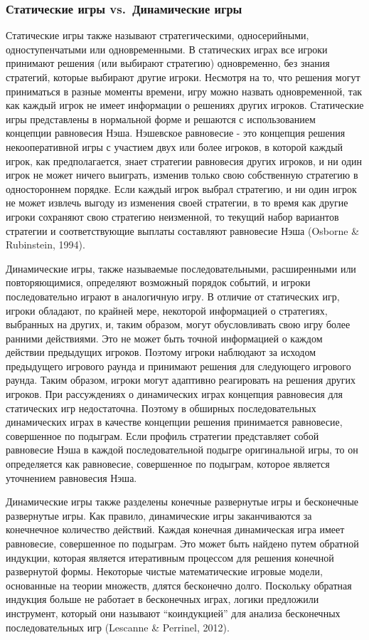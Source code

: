 \subsubsection{Статические игры vs.~Динамические игры}

Статические игры также называют стратегическими, односерийными,
одноступенчатыми или одновременными. В статических играх все игроки
принимают решения (или выбирают стратегию) одновременно, без знания
стратегий, которые выбирают другие игроки. Несмотря на то, что решения
могут приниматься в разные моменты времени, игру можно назвать
одновременной, так как каждый игрок не имеет информации о решениях
других игроков. Статические игры представлены в нормальной форме и
решаются с использованием концепции равновесия Нэша. Нэшевское
равновесие - это концепция решения некооперативной игры с участием двух
или более игроков, в которой каждый игрок, как предполагается, знает
стратегии равновесия других игроков, и ни один игрок не может ничего
выиграть, изменив только свою собственную стратегию в одностороннем
порядке. Если каждый игрок выбрал стратегию, и ни один игрок не может
извлечь выгоду из изменения своей стратегии, в то время как другие
игроки сохраняют свою стратегию неизменной, то текущий набор вариантов
стратегии и соответствующие выплаты составляют равновесие Нэша (Osborne
\& Rubinstein, 1994).

Динамические игры, также называемые последовательными, расширенными или
повторяющимися, определяют возможный порядок событий, и игроки
последовательно играют в аналогичную игру. В отличие от статических игр,
игроки обладают, по крайней мере, некоторой информацией о стратегиях,
выбранных на других, и, таким образом, могут обусловливать свою игру
более ранними действиями. Это не может быть точной информацией о каждом
действии предыдущих игроков. Поэтому игроки наблюдают за исходом
предыдущего игрового раунда и принимают решения для следующего игрового
раунда. Таким образом, игроки могут адаптивно реагировать на решения
других игроков. При рассуждениях о динамических играх концепция
равновесия для статических игр недостаточна. Поэтому в обширных
последовательных динамических играх в качестве концепции решения
принимается равновесие, совершенное по подыграм. Если профиль стратегии
представляет собой равновесие Нэша в каждой последовательной подыгре
оригинальной игры, то он определяется как равновесие, совершенное по
подыграм, которое является уточнением равновесия Нэша.

Динамические игры также разделены конечные развернутые игры и
бесконечные развернутые игры. Как правило, динамические игры
заканчиваются за конечнечное количество действий. Каждая конечная
динамическая игра имеет равновесие, совершенное по подыграм. Это может
быть найдено путем обратной индукции, которая является итеративным
процессом для решения конечной развернутой формы. Некоторые чистые
математические игровые модели, основанные на теории множеств, длятся
бесконечно долго. Поскольку обратная индукция больше не работает в
бесконечных играх, логики предложили инструмент, который они называют
``коиндукцией'' для анализа бесконечных последовательных игр (Lescanne
\& Perrinel, 2012).

